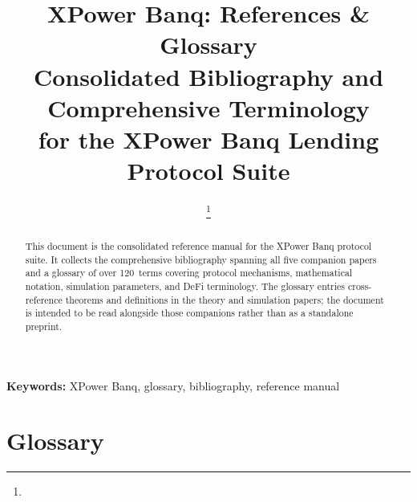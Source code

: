 \documentclass[10pt,a4paper,twocolumn]{article}
\title{\textbf{\Large XPower Banq: References \& Glossary}\\[0.3em]
\normalsize Consolidated Bibliography and Comprehensive Terminology\\
for the XPower Banq Lending Protocol Suite}
\author{
    \banqAuthor\thanks{\banqAuthorContact}
}
\date{}
\begin{document}
\ifbundle\else
\maketitle


\begin{abstract}
This document is the consolidated reference manual for the XPower Banq protocol suite. It collects the comprehensive bibliography spanning all five companion papers~\cite{wp,lck,log,mtp,sim} and a glossary of over 120~terms covering protocol mechanisms, mathematical notation, simulation parameters, and DeFi terminology. The glossary entries cross-reference theorems and definitions in the theory and simulation papers; the document is intended to be read alongside those companions rather than as a standalone preprint.
\end{abstract}

\textbf{Keywords:} XPower Banq, glossary, bibliography, reference manual
\fi


\ifbundle
{}
{}
\fi

\ifbundle\clearpage\fi

\section*{Glossary}
\label{ref:glossary}
\end{document}
